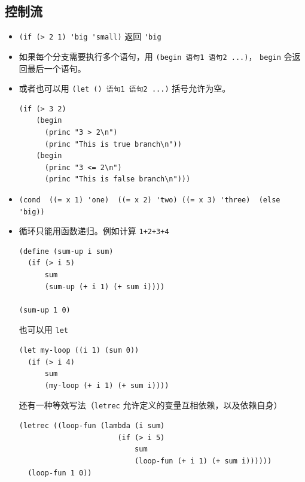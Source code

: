\subsection{控制流}
\begin{itemize}
\item \verb`(if (> 2 1) 'big 'small)` 返回 \verb`'big`
\item 如果每个分支需要执行多个语句，用 \verb`(begin 语句1 语句2 ...)`， \verb`begin` 会返回最后一个语句。
\item 或者也可以用 \verb`(let () 语句1 语句2 ...)` 括号允许为空。
\begin{lstlisting}[language=none]
(if (> 3 2)
    (begin
      (princ "3 > 2\n")
      (princ "This is true branch\n"))
    (begin
      (princ "3 <= 2\n")
      (princ "This is false branch\n")))
\end{lstlisting}
\item \verb`(cond  ((= x 1) 'one)  ((= x 2) 'two) ((= x 3) 'three)  (else 'big))`
\item 循环只能用函数递归。例如计算 \verb`1+2+3+4`
\begin{lstlisting}[language=none]
(define (sum-up i sum)
  (if (> i 5)
      sum
      (sum-up (+ i 1) (+ sum i))))

(sum-up 1 0)
\end{lstlisting}
也可以用 \verb`let`
\begin{lstlisting}[language=none]
(let my-loop ((i 1) (sum 0))
  (if (> i 4)
      sum
      (my-loop (+ i 1) (+ sum i))))
\end{lstlisting}
还有一种等效写法（\verb`letrec` 允许定义的变量互相依赖，以及依赖自身）
\begin{lstlisting}[language=none]
(letrec ((loop-fun (lambda (i sum)
                       (if (> i 5)
                           sum
                           (loop-fun (+ i 1) (+ sum i))))))
  (loop-fun 1 0))
\end{lstlisting}
\end{itemize}

